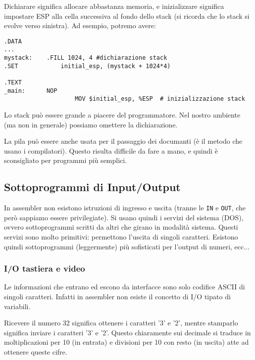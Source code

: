 \documentclass[a4paper,11pt]{article}
\begin{document}
Dichiarare significa allocare abbastanza memoria, e inizializzare significa impostare ESP alla cella successiva al fondo dello stack (si ricorda che lo stack si evolve verso sinistra). Ad esempio, potremo avere:

\begin{lstlisting}	
.DATA
...
mystack:	.FILL 1024, 4 #dichiarazione stack
.SET			initial_esp, (mystack + 1024*4)

.TEXT
_main:		NOP
					MOV $initial_esp, %ESP	# inizializzazione stack
\end{lstlisting}

Lo stack può essere grande a piacere del programmatore.
Nel nostro ambiente (ma non in generale) possiamo omettere la dichiarazione.

La pila può essere anche usata per il passaggio dei documanti (è il metodo che usano i compilatori). 
Questo risulta difficile da fare a mano, e quindi è sconsigliato per programmi più semplici.

\subsection{Sottoprogrammi di Input/Output}
In assembler non esistono istruzioni di ingresso e uscita (tranne le \lstinline|IN| e \lstinline|OUT|, che però sappiamo essere privilegiate).
Si usano quindi i servizi del sistema (DOS), ovvero sottoprogrammi scritti da altri che girano in modalità sistema.
Questi servizi sono molto primitivi: permettono l'uscita di singoli caratteri.
Esistono quindi sottoprogrammi (leggermente) più sofisticati per l'output di numeri, ecc...

\subsubsection{I/O tastiera e video}
Le informazioni che entrano ed escono da interfacce sono solo codifice ASCII di singoli caratteri.
Infatti in assembler non esiste il concetto di I/O tipato di variabili.

Ricevere il numero 32 significa ottenere i caratteri '3' e '2', mentre stamparlo significa inviare i caratteri '3' e '2'.
Questo chiaramente sui decimale si traduce in moltiplicazioni per 10 (in entrata) e divisioni per 10 con resto (in uscita) atte ad ottenere queste cifre.
\end{document}
